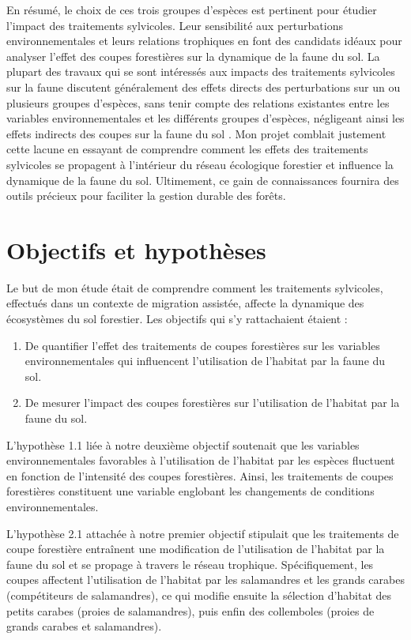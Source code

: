 En résumé, le choix de ces trois groupes d'espèces est pertinent pour étudier l'impact des traitements sylvicoles. 
Leur sensibilité aux perturbations environnementales et leurs relations trophiques en font des candidats idéaux pour analyser l'effet des coupes forestières sur la dynamique de la faune du sol.
La plupart des travaux qui se sont intéressés aux impacts des traitements sylvicoles sur la faune discutent généralement des effets directs des perturbations sur un ou plusieurs groupes d'espèces, 
sans tenir compte des relations existantes entre les variables environnementales et les différents groupes d'espèces, 
négligeant ainsi les effets indirects des coupes sur la faune du sol \citep{josephIntegratingOccupancyModels2016,Pollierer2021Diversityfunctional,Kudrin2023metaanalysiseffects}. 
Mon projet comblait justement cette lacune en essayant de comprendre comment les effets des traitements sylvicoles se propagent à l’intérieur du réseau écologique forestier et influence la dynamique de la faune du sol.  
Ultimement, ce gain de connaissances fournira des outils précieux pour faciliter la gestion durable des forêts.


\section*{Objectifs et hypothèses}
\label{sec:objectifs}

Le but de mon étude était de comprendre comment les traitements sylvicoles, effectués dans un contexte de migration assistée, 
affecte la dynamique des écosystèmes du sol forestier. Les objectifs qui s’y rattachaient étaient :

\begin{enumerate}
    \item De quantifier l'effet des traitements de coupes forestières sur les variables environnementales qui influencent l'utilisation de l'habitat par la faune du sol.
    \item De mesurer l'impact des coupes forestières sur l'utilisation de l'habitat par la faune du sol.
\end{enumerate}

L'hypothèse 1.1 liée à notre deuxième objectif soutenait que les variables environnementales favorables à l'utilisation de l'habitat par les espèces fluctuent 
en fonction de l'intensité des coupes forestières. Ainsi, les traitements de coupes forestières constituent une variable englobant 
les changements de conditions environnementales.

L'hypothèse 2.1 attachée à notre premier objectif stipulait que les traitements de coupe forestière entraînent une modification de l'utilisation de l'habitat 
par la faune du sol et se propage à travers le réseau trophique. Spécifiquement, les coupes affectent l'utilisation de l'habitat par les salamandres et 
les grands carabes (compétiteurs de salamandres), ce qui modifie ensuite la sélection d'habitat des petits carabes (proies de salamandres), puis enfin des collemboles (proies de grands carabes et salamandres).



\cleardoublepage



